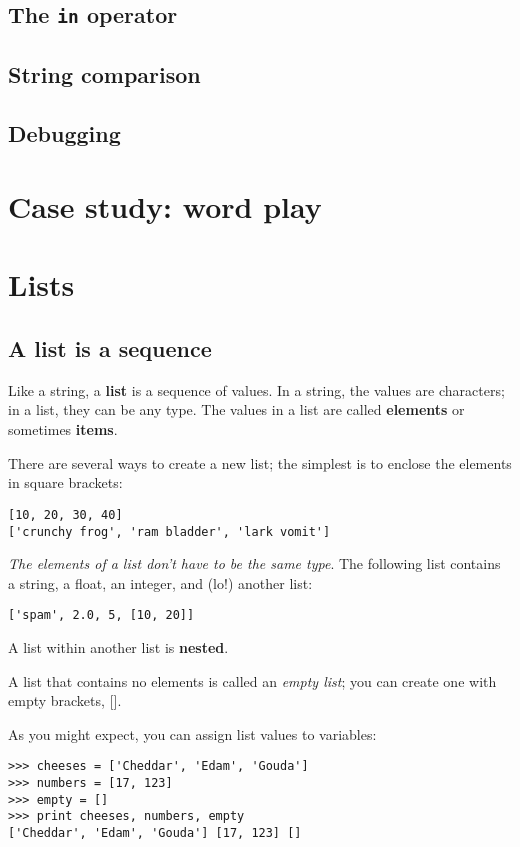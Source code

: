 \documentclass{article}
\begin{document}
\subsection{The \texttt{in} operator}
\subsection{String comparison}
\subsection{Debugging}

\newpage  %
\section{Case study: word play}

\newpage  %
\section{Lists}
\subsection{A list is a sequence}
Like a string, a \textbf{list} is a sequence of values.
In a string, the values
are characters; in a list, they can be any type. The values in a list
are called \textbf{elements} or sometimes \textbf{items}.
\par There are several ways to create a new list; the simplest is to
enclose the elements in square brackets:
\begin{verbatim}
[10, 20, 30, 40]
['crunchy frog', 'ram bladder', 'lark vomit']
\end{verbatim}
\par \emph{The elements of a list don't have to be the same
type}. The following list contains a string, a float, an integer, and
(lo!) another list:
\begin{verbatim}
['spam', 2.0, 5, [10, 20]]
\end{verbatim}
\par A list within another list is \textbf{nested}.
\par A list that contains no elements is called an \emph{empty list};
you can create one with empty brackets, [].
\par As you might expect, you can assign list values to variables:
\begin{verbatim}
>>> cheeses = ['Cheddar', 'Edam', 'Gouda']
>>> numbers = [17, 123]
>>> empty = []
>>> print cheeses, numbers, empty
['Cheddar', 'Edam', 'Gouda'] [17, 123] []
\end{verbatim}
\end{document}
